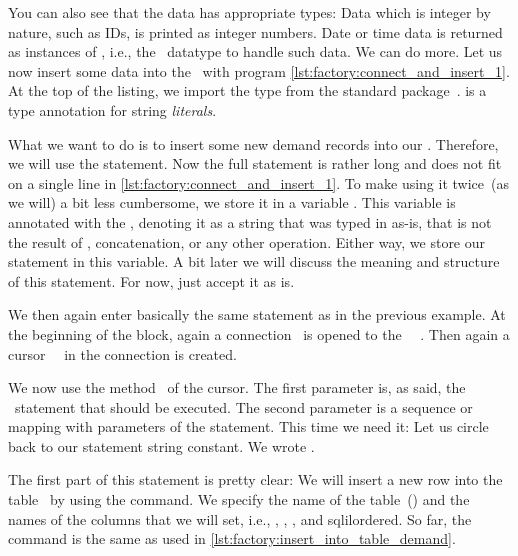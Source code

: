 You can also see that the data has appropriate types:
Data which is integer by nature, such as IDs, is printed as integer numbers.
Date or time data is returned as instances of , i.e., the \python\ datatype to handle such data.%
\FloatBarrier%
\endhsection%
%
%
%
%
%
%
We can do more.
Let us now insert some data into the \db\ with program \cref{lst:factory:connect_and_insert_1}.
At the top of the listing, we import the type  from the standard  package~\cite{PEP675}.
 is a type annotation for string \emph{literals}.

What we want to do is to insert some new demand records into our \db.
Therefore, we will use the  statement.
Now the full  statement is rather long and does not fit on a single line in \cref{lst:factory:connect_and_insert_1}.
To make using it twice~(as we will) a bit less cumbersome, we store it in a variable .
This variable is annotated with the  , denoting it as a string that was typed in as-is, that is not the result of , concatenation, or any other operation.
Either way, we store our statement in this variable.
A bit later we will discuss the meaning and structure of this statement.
For now, just accept it as is.

We then again enter basically the same  statement as in the previous example.
At the beginning of the block, again a connection~ is opened to the \postgresql\ \dbms~\cite{VDGE2022PPDAFP:CC1}.
Then again a cursor~~\cite{VDGE2022PPDAFP:CC2} in the connection is created.
%
%
\begin{sloppypar}%
We now use the method~ of the cursor.
The first parameter is, as said, the \sql\ statement that should be executed.
The second parameter is a sequence or mapping with parameters of the statement.
This time we need it:
Let us circle back to our statement string constant.
We wrote .
\end{sloppypar}%
%
The first part of this statement is pretty clear:
We will insert a new row into the table~ by using the  command.
We specify the name of the table~() and the names of the columns that we will set, i.e., , , , and sqlil{ordered}.
So far, the command is the same as used in \cref{lst:factory:insert_into_table_demand}.

